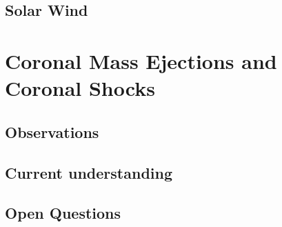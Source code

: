 \subsection{Solar Wind}\label{sec:13}





\section{Coronal Mass Ejections and Coronal Shocks}\label{sec:2}

\subsection{Observations}\label{sec:20}

\subsection{Current understanding}\label{sec:21}

\subsection{Open Questions}\label{sec:22}






